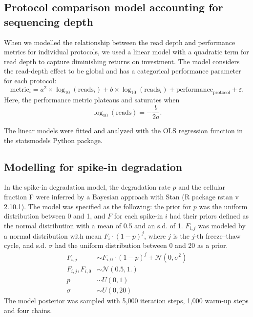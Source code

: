 \subsection{Protocol comparison model accounting for sequencing depth}

\begin{sloppypar}
When we modelled the relationship between the read depth and performance metrics for individual protocols, we used a linear model with a quadratic term for read depth to capture diminishing returns on investment. The model considers the read-depth effect to be global and has a categorical performance parameter for each protocol:
\[
    \text{metric}_i = a^2 \times \log_{10}(\text{reads}_i) + b \times \log_{10}(\text{reads}_i) +  \text{performance}_\text{protocol} + \varepsilon.
\]
Here, the performance metric plateaus and saturates when
\[
    \log_{10} (\text{reads}) = - \frac{b}{2a}.
\]
\end{sloppypar}

The linear models were fitted and analyzed with the OLS regression function in the statsmodels Python package.

\subsection{Modelling for spike-in degradation}

In the spike-in degradation model, the degradation rate \( p \) and the cellular fraction F were inferred by a Bayesian approach with Stan \cite{Carpenter2016-zx} (R package rstan v 2.10.1). The model was specified as the following: the prior for \( p \) was the uniform distribution between 0 and 1, and \( F \) for each spike-in \( i \) had their priors defined as the normal distribution with a mean of 0.5 and an s.d. of 1. \( F_{i,j} \) was modeled by a normal distribution with mean \( F_i \cdot (1 - p)^j \), where \( j \) is the \( j \)-th freeze–thaw cycle, and s.d. \( \sigma \) had the uniform distribution between 0 and 20 as a prior.
\begin{align*}
    F_{i,j} & \sim F_{i, 0} \cdot (1 - p)^j + \mathcal{N}(0, \sigma^2 ) \\
    F_{i, j}, F_{i, 0} & \sim \mathcal{N}(0.5, 1.) \\
    p & \sim U(0, 1) \\
    \sigma & \sim U(0, 20)
\end{align*}
The model posterior was sampled with 5,000 iteration steps, 1,000 warm-up steps and four chains.
